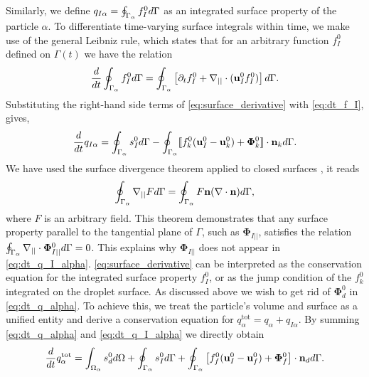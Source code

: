 Similarly, we define $q_{I\alpha} = \oint_{\Gamma_\alpha}  f_I^0 d\Gamma$ as an integrated surface property of the particle $\alpha$.
To differentiate time-varying surface integrals within time, we make use of the general Leibniz rule, which states that for an arbitrary function $f_I^0$ defined on $\Gamma(t)$ we have the relation \citep{nadim1996concise}
\begin{equation}
    \frac{d}{dt}  \oint_{\Gamma_\alpha} f_I^0  d\Gamma
    = \oint_{\Gamma_\alpha}  \left[
        \partial_t f_I^0
        +   \mathbf{\nabla}_{||} \cdot (\textbf{u}_I^0f_I^0)
    \right] d\Gamma.
    \label{eq:surface_derivative}
\end{equation}
Substituting the right-hand side terms of \ref{eq:surface_derivative} with \ref{eq:dt_f_I}, gives,
\begin{equation}
    \frac{d}{dt}  q_{I\alpha}
    = \oint_{\Gamma_\alpha}  
        s_I^0
     d\Gamma
    - \oint_{\Gamma_\alpha} 
 \llbracket 
        f_k^0 (\textbf{u}_I^0 - \textbf{u}_k^0)
        + \mathbf{\Phi}_k^0
     \rrbracket \cdot \textbf{n}_k
     d\Gamma.
    \label{eq:dt_q_I_alpha}
\end{equation}
We have used the surface divergence theorem applied to closed surfaces \citep{nadim1996concise}, it reads
\begin{equation}
    \oint_{\Gamma_\alpha} \mathbf{\nabla}_{||} F d\Gamma
    = 
    \oint_{\Gamma_\alpha}  F \textbf{n} (\mathbf{\nabla}\cdot \textbf{n}) d\Gamma,
    \label{eq:gauss_surface}
\end{equation} 
where $F$ is an arbitrary field.
This theorem demonstrates that any surface property parallel to the tangential plane of $\Gamma$, such as $\bm\Phi_{I||}$, satisfies the relation $\oint_{\Gamma_\alpha} \mathbf{\nabla}_{||}\cdot \bm\Phi_{I||}^0 d\Gamma
= 0$.
This explains why $\bm\Phi_{I||}$ does not appear in \ref{eq:dt_q_I_alpha}. 
\ref{eq:surface_derivative} can be interpreted as the conservation equation for the integrated surface property $f_I^0$, or as the jump condition of the $f^0_k$ integrated on the droplet surface. 
As discussed above we wish to get rid of $\mathbf{\Phi}_d^0$ in \ref{eq:dt_q_alpha}. 
To achieve this, we treat the particle's volume and surface as a unified entity and derive a conservation equation for $q_\alpha^\text{tot} = q_\alpha + q_{I\alpha}$. 
By summing \ref{eq:dt_q_alpha} and \ref{eq:dt_q_I_alpha} we directly obtain 
\begin{equation}
    \frac{d}{dt}  q_\alpha^\text{tot}
    = 
    \int_{\Omega_\alpha}  s_d^0  d\Omega
    + \oint_{\Gamma_\alpha}  s_I^0  d\Gamma
    + \oint_{\Gamma_\alpha}  \left[
        f_f^0 (\textbf{u}_I^0-\textbf{u}_f^0) 
        + \mathbf{\Phi}_f^0 
        \right] \cdot \textbf{n}_d  d\Gamma. 
    \label{eq:dt_q_alpha_tot}
\end{equation}
